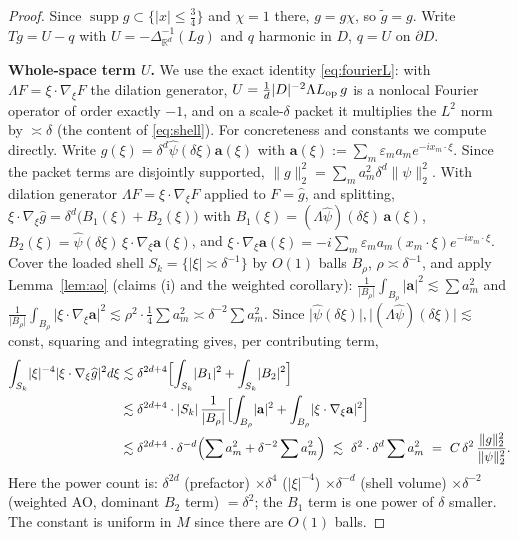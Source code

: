 \documentclass[11pt]{article}
\theoremstyle{remark}
\newcommand{\R}{\mathbb{R}}
\newcommand{\norm}[1]{\lVert #1\rVert}
\newcommand{\abs}[1]{\lvert #1\rvert}
\newcommand{\SET}[1]{\{#1\}}
\DeclareMathOperator{\supp}{supp}
\begin{document}
\begin{proof}
Since $\supp g\subset\SET{\abs x\le\tfrac34}$ and $\chi=1$ there, $g=g\chi$,
so $\tilde g=g$. Write
$Tg=U-q$ with $U=-\Delta^{-1}_{\R^d}(Lg)$ and $q$ harmonic in $D$,
$q=U$ on $\partial D$.

\smallskip
\noindent\textbf{Whole-space term $U$.} We use the exact identity
\eqref{eq:fourierL}: with $\Lambda F=\xi\cdot\nabla_\xi F$ the dilation
generator, $U=\frac1d\abs D^{-2}\Lambda L_{\rm op}\,g$ is a nonlocal
Fourier operator of order exactly $-1$, and on a scale-$\delta$ packet it
multiplies the $L^{2}$ norm by $\asymp\delta$ (the content of
\eqref{eq:shell}). For concreteness and constants we compute directly.
Write
$\widehat g(\xi)=\delta^{d}\widehat\psi(\delta\xi)\mathbf a(\xi)$ with
$\mathbf a(\xi):=\sum_m\varepsilon_m a_m e^{-ix_m\cdot\xi}$. Since the
packet terms are disjointly supported,
$\norm{g}_2^{2}=\sum_m a_m^{2}\delta^{d}\norm{\psi}_2^{2}$. With
dilation generator $\Lambda F=\xi\cdot\nabla_\xi F$ applied to
$F=\widehat g$, and splitting,
$\xi\cdot\nabla_\xi\widehat g
=\delta^{d}\bigl(B_1(\xi)+B_2(\xi)\bigr)$ with
$B_1(\xi)=(\Lambda\widehat\psi)(\delta\xi)\,\mathbf a(\xi)$,
$B_2(\xi)=\widehat\psi(\delta\xi)\,\xi\cdot\nabla_\xi\mathbf a(\xi)$, and
$\xi\cdot\nabla_\xi\mathbf a(\xi)
=-i\sum_m\varepsilon_m a_m (x_m\cdot\xi)e^{-ix_m\cdot\xi}$.
Cover the loaded shell $S_k=\SET{\abs\xi\asymp\delta^{-1}}$ by $O(1)$
balls $B_\rho$, $\rho\asymp\delta^{-1}$, and apply Lemma~\ref{lem:ao}
(claims (i) and the weighted corollary):
$\frac1{\abs{B_\rho}}\int_{B_\rho}\abs{\mathbf a}^{2}\lesssim\sum a_m^{2}$
and
$\frac1{\abs{B_\rho}}\int_{B_\rho}\abs{\xi\cdot\nabla_\xi\mathbf a}^{2}
\lesssim\rho^{2}\cdot\tfrac14\sum a_m^{2}\asymp\delta^{-2}\sum a_m^{2}$.
Since $\abs{\widehat\psi(\delta\xi)},\abs{(\Lambda\widehat\psi)(\delta\xi)}
\lesssim$ const, squaring and integrating gives, per contributing term,
\begin{align}\label{eq:uterm}
\int_{S_k}\abs\xi^{-4}\abs{\xi\cdot\nabla_\xi\widehat g}^{2}d\xi
&\lesssim\delta^{2d+4}\Bigl[
\int_{S_k}\abs{B_1}^{2}+\int_{S_k}\abs{B_2}^{2}\Bigr]
\nonumber\\
&\lesssim\delta^{2d+4}\cdot\abs{S_k}\,
\frac1{\abs{B_\rho}}\Bigl[
\int_{B_\rho}\abs{\mathbf a}^{2}
+\int_{B_\rho}\abs{\xi\cdot\nabla_\xi\mathbf a}^{2}\Bigr]
\nonumber\\
&\lesssim\delta^{2d+4}\cdot\delta^{-d}
\Bigl(\sum a_m^{2}+\delta^{-2}\sum a_m^{2}\Bigr)
\ \lesssim\ \delta^{2}\cdot\delta^{d}\sum a_m^{2}
\ =\ C\,\delta^{2}\,\frac{\norm{g}_2^{2}}{\norm{\psi}_2^{2}} .
\end{align}
Here the power count is: $\delta^{2d}$ (prefactor) $\times\delta^{4}$
($|\xi|^{-4}$) $\times\delta^{-d}$ (shell volume) $\times\delta^{-2}$
(weighted AO, dominant $B_2$ term) $=\delta^{2}$; the $B_1$ term is one
power of $\delta$ smaller. The constant is uniform in $M$ since there are
$O(1)$ balls.


\end{proof}
\end{document}
